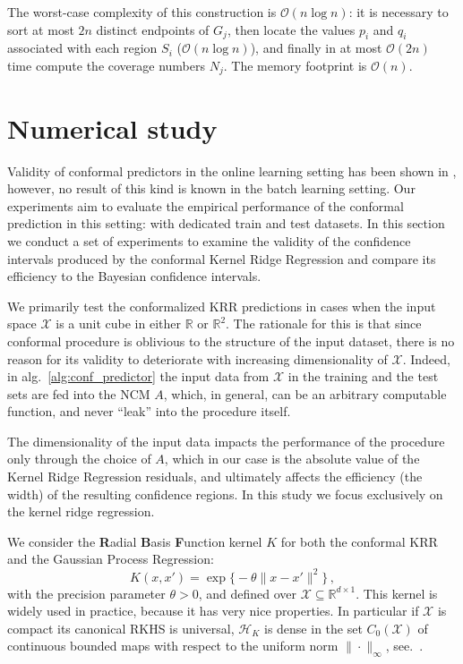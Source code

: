 \documentclass{ITaSconf}
\newcommand{\Hcal}{\mathcal{H}}
\newcommand{\Xcal}{\mathcal{X}}
\newcommand{\Real}{\mathbb{R}}
\begin{document}
The worst-case complexity of this construction is $\mathcal{O}(n \log n)$: it is
necessary to sort at most $2n$ distinct endpoints of $G_j$, then locate the values
$p_i$ and $q_i$ associated with each region $S_i$ ($\mathcal{O}(n\log n)$), and
finally in at most $\mathcal{O}(2n)$ time compute the coverage numbers $N_j$. The
memory footprint is $\mathcal{O}(n)$.



\section{Numerical study} %
\label{sec:numerical_study}

Validity of conformal predictors in the online learning setting has been shown in
\cite{vovk2005}, however, no result of this kind is known in the batch learning setting.
Our experiments aim to evaluate the empirical performance of the conformal prediction
in this setting: with dedicated train and test datasets. In this section we conduct
a set of experiments to examine the validity of the confidence intervals produced
by the conformal Kernel Ridge Regression and compare its efficiency to the Bayesian
confidence intervals.

We primarily test the conformalized KRR predictions in cases when the input space
$\Xcal$ is a unit cube in either $\Real$ or $\Real^2$. The rationale for this is
that since conformal procedure is oblivious to the structure of the input dataset,
there is no reason for its validity to deteriorate with increasing dimensionality
of $\Xcal$. Indeed, in alg.~\ref{alg:conf_predictor} the input data from $\Xcal$
in the training and the test sets are fed into the NCM $A$, which, in general, can
be an arbitrary computable function, and never ``leak'' into the procedure itself.

The dimensionality of the input data impacts the performance of the procedure only
through the choice of $A$, which in our case is the absolute value of the Kernel
Ridge Regression residuals, and ultimately affects the efficiency (the width) of
the resulting confidence regions. In this study we focus exclusively on the kernel
ridge regression.

We consider the \textbf{R}adial \textbf{B}asis \textbf{F}unction kernel $K$ for both
the conformal KRR and the Gaussian Process Regression:
\begin{equation*}
  K(x,x')
  = \mathop{\text{exp}}\bigl\{-\theta \|x-x' \|^2\bigr\}
  \,,
\end{equation*}
with the precision parameter $\theta>0$, and defined over $\Xcal \subseteq \Real^{d\times 1}$.
This kernel is widely used in practice, because it has very nice properties. In
particular if $\Xcal$ is compact its canonical RKHS is universal, $\Hcal_K$ is dense
in the set $C_0(\Xcal)$ of continuous bounded maps with respect to the uniform norm
$\|\cdot\|_\infty$, see.~\cite{ref:rbf_universal}.
\end{document}
